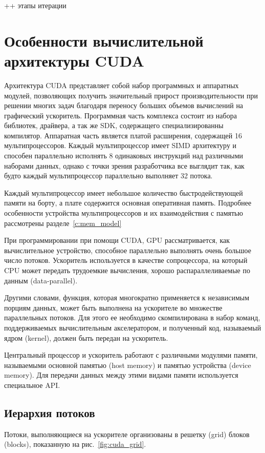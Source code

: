 ++ этапы итерации

\section{Особенности вычислительной архитектуры CUDA}

Архитектура CUDA представляет собой набор программных и аппаратных модулей, позволяющих получить значительный прирост производительности при решении многих задач благодаря переносу больших объемов вычислений на графический ускоритель. Программная часть комплекса состоит из набора библиотек, драйвера, а так же SDK, содержащего специализированны компилятор. Аппаратная часть является платой расширения, содержащей 16 мультипроцессоров. Каждый мультипроцессор имеет SIMD архитектуру и способен параллельно исполнять 8 одинаковых инструкций над различными наборами данных, однако с точки зрения разработчика все выглядит так, как будто каждый мультипроцессор параллельно выполняет 32 потока. 

Каждый мультипроцессор имеет небольшое количество быстродействующей памяти на борту, а плате содержится основная оперативная память. Подробнее особенности устройства мультипроцессоров и их взаимодействия с памятью рассмотрены разделе~\ref{c:mem_model}

При программировании при помощи CUDA, GPU рассматривается, как вычислительное устройство, способное параллельно выполнять очень большое число потоков. Ускоритель используется в качестве сопроцессора, на который CPU может передать трудоемкие вычисления, хорошо распараллеливаемые по данным (data-parallel).

Другими словами, функция, которая многократно применяется к независимым порциям данных, может быть выполнена на ускорителе во множестве параллельных потоков. Для этого ее необходимо скомпилирована в набор команд, поддерживаемых вычислительным акселератором, и полученный код, называемый ядром (kernel), должен быть передан на ускоритель.

Центральный процессор и ускоритель работают с различными модулями памяти, называемыми основной памятью (host memory) и памятью устройства (device memory). Для передачи данных между этими видами памяти используется специальное API.

\subsection{Иерархия потоков}
Потоки, выполняющиеся на ускорителе организованы в решетку (grid) блоков (blocks), показанную на рис.~\ref{fig:cuda_grid}.

